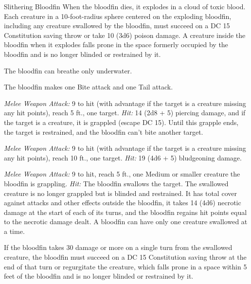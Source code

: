 \documentclass[10pt,a4paper,twoside,bg=print,twocolumn,openany,nodeprecatedcode]{dndbook}
\begin{document}
\begin{DndMonster}[float=t]{Slithering Bloodfin}
\DndMonsterBasics[
armor-class = {16 (natural armor)},
hit-points = {\DndDice{11d10 + 33}},
speed = {5 ft., swim 50 ft.}
]
\DndMonsterAbilityScores[
 str = 20,
 dex = 14,
 con = 16,
 int = 2,
 wis = 10,
 cha = 3
]
\DndMonsterDetails[
skills = {Perception +4},
damage-immunities = {poison},
condition-immunities = {poisoned},
senses = {blindsight 100 ft. (blind beyond this radius), passive perception 14},
challenge = 9,
]
When the bloodfin dies, it explodes in a cloud of toxic blood. Each creature in a 10-foot-radius sphere centered on the exploding bloodfin, including any creature swallowed by the bloodfin, must succeed on a DC 15 Constitution saving throw or take 10 (3d6) poison damage. A creature inside the bloodfin when it explodes falls prone in the space formerly occupied by the bloodfin and is no longer blinded or restrained by it.

The bloodfin can breathe only underwater.

The bloodfin makes one Bite attack and one Tail attack.

\textsl{Melee Weapon Attack:} 9 to hit (with advantage if the target is a creature missing any hit points), reach 5 ft., one target. \textsl{Hit:} 14 (2d8 + 5) piercing damage, and if the target is a creature, it is grappled (escape DC 15). Until this grapple ends, the target is restrained, and the bloodfin can't bite another target.

\textsl{Melee Weapon Attack:} 9 to hit (with advantage if the target is a creature missing any hit points), reach 10 ft., one target. \textsl{Hit:} 19 (4d6 + 5) bludgeoning damage.

\textsl{Melee Weapon Attack:} 9 to hit, reach 5 ft., one Medium or smaller creature the bloodfin is grappling. \textsl{Hit:} The bloodfin swallows the target. The swallowed creature is no longer grappled but is blinded and restrained. It has total cover against attacks and other effects outside the bloodfin, it takes 14 (4d6) necrotic damage at the start of each of its turns, and the bloodfin regains hit points equal to the necrotic damage dealt. A bloodfin can have only one creature swallowed at a time.

If the bloodfin takes 30 damage or more on a single turn from the swallowed creature, the bloodfin must succeed on a DC 15 Constitution saving throw at the end of that turn or regurgitate the creature, which falls prone in a space within 5 feet of the bloodfin and is no longer blinded or restrained by it.

\end{DndMonster}
\end{document}
